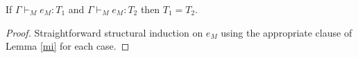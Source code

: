 \begin{muot}
\label{muot}
If $\Gamma\vdash_{M}e_{M}:T_{1}$ and $\Gamma\vdash_{M}e_{M}:T_{2}$ then $T_{1}=T_{2}$.
\begin{proof}
Straightforward structural induction on $e_{M}$ using the appropriate clause of Lemma \ref{mi} for each case.
\end{proof}
\end{muot}